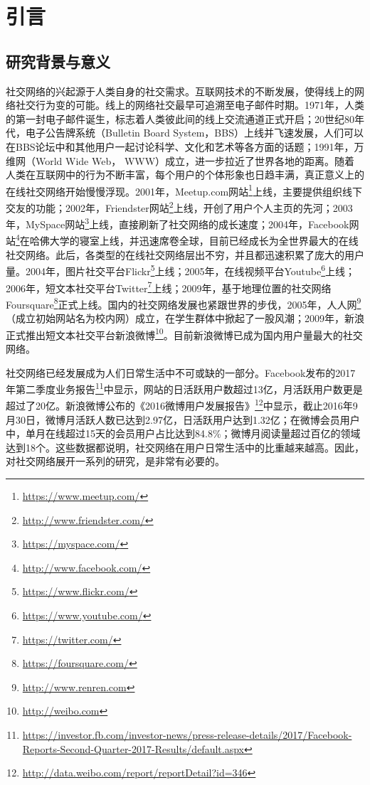 \chapter{引言}
\label{chap:introduction}

\section{研究背景与意义}
社交网络的兴起源于人类自身的社交需求。互联网技术的不断发展，使得线上的网络社交行为变的可能。线上的网络社交最早可追溯至电子邮件时期。1971年，人类的第一封电子邮件诞生，标志着人类彼此间的线上交流通道正式开启；20世纪80年代，电子公告牌系统（Bulletin Board System，BBS）上线并飞速发展，人们可以在BBS论坛中和其他用户一起讨论科学、文化和艺术等各方面的话题；1991年，万维网（World Wide Web， WWW）成立，进一步拉近了世界各地的距离。随着人类在互联网中的行为不断丰富，每个用户的个体形象也日趋丰满，真正意义上的在线社交网络开始慢慢浮现。2001年，Meetup.com网站\footnote{\url{https://www.meetup.com/}}上线，主要提供组织线下交友的功能；2002年，Friendster网站\footnote{\url{http://www.friendster.com/}}上线，开创了用户个人主页的先河；2003年，MySpace网站\footnote{\url{https://myspace.com/}}上线，直接刷新了社交网络的成长速度；2004年，Facebook网站\footnote{\url{http://www.facebook.com/}}在哈佛大学的寝室上线，并迅速席卷全球，目前已经成长为全世界最大的在线社交网络。此后，各类型的在线社交网络层出不穷，并且都迅速积累了庞大的用户量。2004年，图片社交平台Flickr\footnote{\url{https://www.flickr.com/}}上线；2005年，在线视频平台Youtube\footnote{\url{https://www.youtube.com/}}上线；2006年，短文本社交平台Twitter\footnote{\url{https://twitter.com/}}上线；2009年，基于地理位置的社交网络Foursquare\footnote{\url{https://foursquare.com/}}正式上线。国内的社交网络发展也紧跟世界的步伐，2005年，人人网\footnote{\url{http://www.renren.com}}（成立初始网站名为校内网）成立，在学生群体中掀起了一股风潮；2009年，新浪正式推出短文本社交平台新浪微博\footnote{\url{http://weibo.com}}。目前新浪微博已成为国内用户量最大的社交网络。

社交网络已经发展成为人们日常生活中不可或缺的一部分。Facebook发布的2017年第二季度业务报告\footnote{\url{https://investor.fb.com/investor-news/press-release-details/2017/Facebook-Reports-Second-Quarter-2017-Results/default.aspx}}中显示，网站的日活跃用户数超过13亿，月活跃用户数更是超过了20亿。新浪微博公布的《2016微博用户发展报告》\footnote{\url{http://data.weibo.com/report/reportDetail?id=346}}中显示，截止2016年9月30日，微博月活跃人数已达到2.97亿，日活跃用户达到1.32亿；在微博会员用户中，单月在线超过15天的会员用户占比达到84.8\%；微博月阅读量超过百亿的领域达到18个。这些数据都说明，社交网络在用户日常生活中的比重越来越高。因此，对社交网络展开一系列的研究，是非常有必要的。

